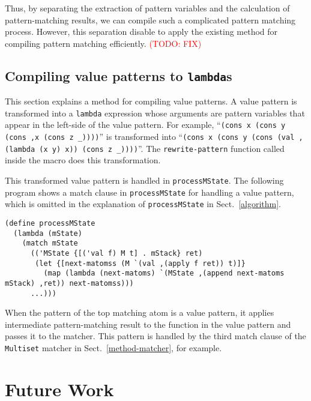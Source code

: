 \documentclass[acmlarge]{acmart}
\newcommand{\todo}[1]{\textcolor{red}{(TODO: #1)}}
\begin{document}
\medskip

Thus, by separating the extraction of pattern variables and the calculation of pattern-matching results, we can compile such a complicated pattern matching process.
However, this separation disable to apply the existing method for compiling pattern matching efficiently.
\todo{FIX}

\subsection{Compiling value patterns to \texttt{lambda}s}\label{method-val-pat}

This section explains a method for compiling value patterns.
A value pattern is transformed into a \texttt{lambda} expression whose arguments are pattern variables that appear in the left-side of the value pattern.
For example, ``\texttt{(cons x (cons y (cons ,x (cons z _))))}'' is transformed into ``\texttt{(cons x (cons y (cons (val ,(lambda (x y) x)) (cons z _))))}''.
The \texttt{rewrite-pattern} function called inside the macro does this transformation.

This transformed value pattern is handled in \texttt{processMState}.
The following program shows a match clause in \texttt{processMState} for handling a value pattern, which is omitted in the explanation of \texttt{processMState} in Sect.~\ref{algorithm}.

\begin{lstlisting}[language=egison]
(define processMState
  (lambda (mState)
    (match mState
      (('MState {[('val f) M t] . mStack} ret)
       (let {[next-matomss (M `(val ,(apply f ret)) t)]}
         (map (lambda (next-matoms) `(MState ,(append next-matoms mStack) ,ret)) next-matomss)))
      ...)))
\end{lstlisting}

\noindent
When the pattern of the top matching atom is a value pattern, it applies intermediate pattern-matching result to the function in the value pattern and passes it to the matcher.
This pattern is handled by the third match clause of the \texttt{Multiset} matcher in Sect.~\ref{method-matcher}, for example.

\section{Future Work}\label{future}

%
%
%
%
%
\end{document}
